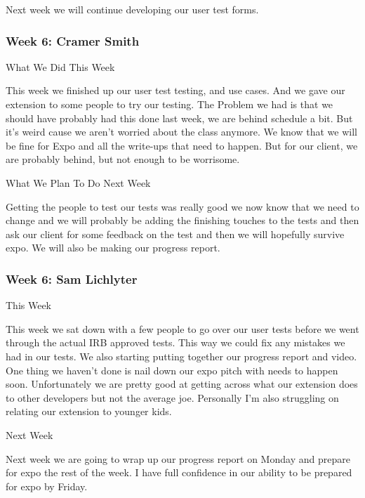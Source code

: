 Next week we will continue developing our user test forms. \\ 

 \subsubsection{Week 6: Cramer Smith}

What We Did This Week



This week we finished up our user test testing, and use cases. And we gave our extension to some people to try our testing. The Problem we had is that we should have probably had this done last week, we are behind schedule a bit. But it's weird cause we aren't worried about the class anymore. We know that we will be fine for Expo and all the write-ups that need to happen. But for our client, we are probably behind, but not enough to be worrisome. 



What We Plan To Do Next Week



Getting the people to test our tests was really good we now know that we need to change and we will probably be adding the finishing touches to the tests and then ask our client for some feedback on the test and then we will hopefully survive expo. We will also be making our progress report. \\ 

 

 \subsubsection{Week 6: Sam Lichlyter}

This Week

This week we sat down with a few people to go over our user tests before we went through the actual IRB approved tests. This way we could fix any mistakes we had in our tests. We also starting putting together our progress report and video. One thing we haven't done is nail down our expo pitch with needs to happen soon. Unfortunately we are pretty good at getting across what our extension does to other developers but not the average joe. Personally I'm also struggling on relating our extension to younger kids.



Next Week

Next week we are going to wrap up our progress report on Monday and prepare for expo the rest of the week. I have full confidence in our ability to be prepared for expo by Friday. \\ 

